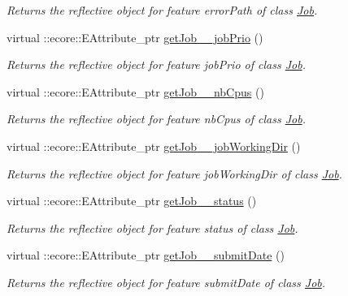 \begin{DoxyCompactItemize}
\begin{DoxyCompactList}\small\item\em Returns the reflective object for feature errorPath of class \hyperlink{classTMS__Data_1_1Job}{Job}. \item\end{DoxyCompactList}\item 
virtual ::ecore::EAttribute\_\-ptr \hyperlink{classTMS__Data_1_1TMS__DataPackage_aed7db8ac71e07c4a63ac949c1c2fadca}{getJob\_\-\_\-jobPrio} ()
\begin{DoxyCompactList}\small\item\em Returns the reflective object for feature jobPrio of class \hyperlink{classTMS__Data_1_1Job}{Job}. \item\end{DoxyCompactList}\item 
virtual ::ecore::EAttribute\_\-ptr \hyperlink{classTMS__Data_1_1TMS__DataPackage_a65f47743326c44dbc5ead90713c66231}{getJob\_\-\_\-nbCpus} ()
\begin{DoxyCompactList}\small\item\em Returns the reflective object for feature nbCpus of class \hyperlink{classTMS__Data_1_1Job}{Job}. \item\end{DoxyCompactList}\item 
virtual ::ecore::EAttribute\_\-ptr \hyperlink{classTMS__Data_1_1TMS__DataPackage_a8c6e17896e720eb1cf3d6a9d043ec16b}{getJob\_\-\_\-jobWorkingDir} ()
\begin{DoxyCompactList}\small\item\em Returns the reflective object for feature jobWorkingDir of class \hyperlink{classTMS__Data_1_1Job}{Job}. \item\end{DoxyCompactList}\item 
virtual ::ecore::EAttribute\_\-ptr \hyperlink{classTMS__Data_1_1TMS__DataPackage_a6c6ae35b72a57d4dc01384b4b3decdef}{getJob\_\-\_\-status} ()
\begin{DoxyCompactList}\small\item\em Returns the reflective object for feature status of class \hyperlink{classTMS__Data_1_1Job}{Job}. \item\end{DoxyCompactList}\item 
virtual ::ecore::EAttribute\_\-ptr \hyperlink{classTMS__Data_1_1TMS__DataPackage_a9572c1db88adadb0f3ae9af3e2f54cea}{getJob\_\-\_\-submitDate} ()
\begin{DoxyCompactList}\small\item\em Returns the reflective object for feature submitDate of class \hyperlink{classTMS__Data_1_1Job}{Job}. \item\end{DoxyCompactList}\item 

\end{DoxyCompactItemize}

